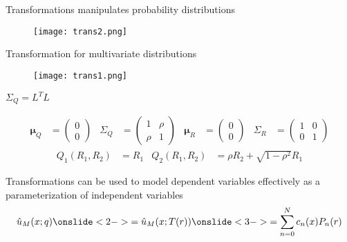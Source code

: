 \documentclass{beamer}
\begin{document}
\begin{frame}{Transformations manipulates probability distributions}
\begin{figure}
 \texttt{[image: trans2.png]}
\end{figure}
\end{frame}


\begin{frame}{Transformation for multivariate distributions}{}
\begin{figure}
 \texttt{[image: trans1.png]}
\end{figure}
    \begin{flushright}
        $\Sigma_Q = L^TL$
    \end{flushright}
    \scriptsize
\pause
    \begin{align*}
        \bm\mu_Q &=
        \begin{pmatrix}
            0 \\ 0
        \end{pmatrix} &
        \Sigma_Q &=
        \begin{pmatrix}
            1 & \rho \\ \rho & 1
        \end{pmatrix} &
        \bm\mu_R &=
        \begin{pmatrix}
            0 \\ 0
        \end{pmatrix} &
        \Sigma_R &=
        \begin{pmatrix}
            1 & 0 \\ 0 & 1
        \end{pmatrix}
    \end{align*}
    \pause
    \normalsize
    \begin{align*}
        Q_1(R_1, R_2) &= R_1 &
        Q_2(R_1, R_2) &= \rho R_2 + \sqrt{1-\rho^2} R_1
    \end{align*}
\end{frame}

\begin{frame}{Transformations can be used to model dependent
    variables effectively as a parameterization of independent
    variables}{}
    \begin{align*}
        \hat u_M(x; q)
        \onslide<2->{= \hat u_M(x; T(r))}
        \onslide<3->{= \sum_{n=0}^N c_n(x) P_n(r)}
    \end{align*}
\end{frame}
\end{document}

